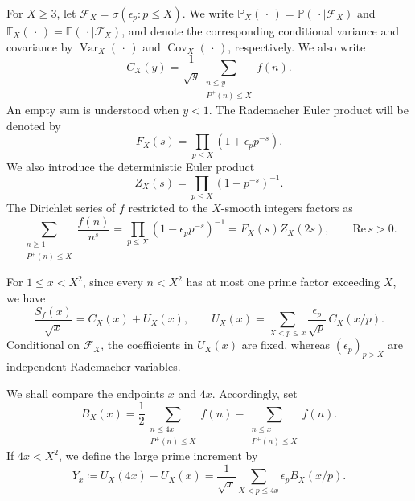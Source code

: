 \documentclass[a4paper,12pt,reqno]{amsart}
\numberwithin{equation}{section}
\theoremstyle{remark}
\newcommand{\E}{\mathbb{E}}
\newcommand{\p}{\mathbb{P}}
\newcommand{\var}{\operatorname{Var}}
\newcommand{\cov}{\operatorname{Cov}}
\begin{document}
For $X\geq3$, let $\mathscr F_X=\sigma(\epsilon_p:p\leq X)$. We write
$\p_X(\,\cdot\,)=\p(\,\cdot\mid\mathscr F_X)$ and
$\E_X(\,\cdot\,)=\E(\,\cdot\mid\mathscr F_X)$, and denote the
corresponding conditional variance and covariance by $\var_X(\,\cdot\,)$ and
$\cov_X(\,\cdot\,)$, respectively. We also write
\begin{equation}\label{eq:def-H-C}
 C_X(y)=\frac1{\sqrt y}
 \sum_{\substack{n\leq y\\P^+(n)\leq X}}f(n).
\end{equation}
An empty sum is understood when $y<1$.  The Rademacher Euler product will
be denoted by
\begin{equation}\label{eq:def-squarefree-product}
 F_X(s)=\prod_{p\leq X}(1+\epsilon_pp^{-s}).
\end{equation}
We also introduce the deterministic Euler product
\begin{equation}\label{eq:def-zeta-product}
 Z_X(s)=\prod_{p\leq X}(1-p^{-s})^{-1}.
\end{equation}
The Dirichlet series of $f$ restricted to the $X$-smooth integers factors
as
\begin{equation}\label{eq:finite-euler-factorisation}
 \sum_{\substack{n\geq1\\P^+(n)\leq X}}\frac{f(n)}{n^s}
 =
 \prod_{p\leq X}(1-\epsilon_pp^{-s})^{-1}
 =
 F_X(s)Z_X(2s),
 \qquad \mathrm{Re}\,s>0.
\end{equation}

For $1\leq x<X^2$, since every \(n<X^2\) has at most one prime factor exceeding \(X\), we have
\begin{equation}\label{eq:fresh-decomposition}
 \frac{S_f(x)}{\sqrt x}
 =
 C_X(x)+U_X(x),
 \qquad
 U_X(x)=
 \sum_{X<p\leq x}\frac{\epsilon_p}{\sqrt p}\,C_X(x/p).
\end{equation}
Conditional on $\mathscr F_X$, the coefficients in $U_X(x)$ are fixed,
whereas $(\epsilon_p)_{p>X}$ are independent Rademacher variables.

We shall compare the endpoints $x$ and $4x$. Accordingly, set
\begin{equation}\label{eq:def-B}
 B_X(x)=
 \frac12\sum_{\substack{n\leq4x\\P^+(n)\leq X}}f(n)
 -
 \sum_{\substack{n\leq x\\P^+(n)\leq X}}f(n).
\end{equation}
If $4x<X^2$, we define the large prime increment by
\begin{equation}\label{eq:fresh-increment}
 Y_x
 \coloneqq U_X(4x)-U_X(x)
 =
 \frac1{\sqrt x}\sum_{X<p\leq4x}\epsilon_pB_X(x/p).
\end{equation}
\end{document}

